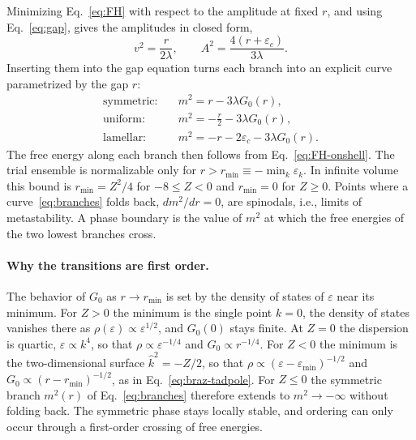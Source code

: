 \documentclass[aps,prd,twocolumn,superscriptaddress,nofootinbib,10pt]{revtex4-2}
\newcommand{\khat}{\widehat{k}^{2}}
\begin{document}
Minimizing Eq.~\eqref{eq:FH} with respect to the amplitude at fixed $r$, and
using Eq.~\eqref{eq:gap}, gives the amplitudes in closed form,
\begin{equation}
 v^2=\frac{r}{2\lambda},\qquad A^2=\frac{4(r+\varepsilon_c)}{3\lambda}.
 \label{eq:amp}
\end{equation}
Inserting them into the gap equation turns each branch into an explicit
curve parametrized by the gap $r$:
\begin{equation}
\begin{aligned}
 \text{symmetric:}\quad& m^2=r-3\lambda G_0(r),\\
 \text{uniform:}\quad& m^2=-\tfrac r2-3\lambda G_0(r),\\
 \text{lamellar:}\quad& m^2=-r-2\varepsilon_c-3\lambda G_0(r).
\end{aligned}
\label{eq:branches}
\end{equation}
The free energy along each branch then follows from
Eq.~\eqref{eq:FH-onshell}.  The trial ensemble is normalizable only for
$r>r_{\min}\equiv-\min_k\varepsilon_k$.  In infinite volume this bound is
$r_{\min}=Z^2/4$ for $-8\le Z<0$ and $r_{\min}=0$ for $Z\ge0$.  Points where
a curve~\eqref{eq:branches} folds back, $dm^2/dr=0$, are spinodals, i.e.,
limits of metastability.  A phase boundary is the value of $m^2$ at which the
free energies of the two lowest branches cross.

\paragraph*{Why the transitions are first order.}
The behavior of $G_0$ as $r\to r_{\min}$ is set by the density of states of
$\varepsilon$ near its minimum.  For $Z>0$ the minimum is the single point
$k=0$, the density of states vanishes there as
$\rho(\varepsilon)\propto\varepsilon^{1/2}$, and $G_0(0)$ stays finite.  At
$Z=0$ the dispersion is quartic, $\varepsilon\propto k^4$, so that
$\rho\propto\varepsilon^{-1/4}$ and $G_0\propto r^{-1/4}$.  For $Z<0$ the
minimum is the two-dimensional surface $\khat=-Z/2$, so that
$\rho\propto(\varepsilon-\varepsilon_{\min})^{-1/2}$ and
$G_0\propto(r-r_{\min})^{-1/2}$, as in Eq.~\eqref{eq:braz-tadpole}.  For
$Z\le0$ the symmetric branch $m^2(r)$ of Eq.~\eqref{eq:branches} therefore
extends to $m^2\to-\infty$ without folding back.  The symmetric phase stays
locally stable, and ordering can only occur through a first-order crossing of
free energies.
\end{document}
